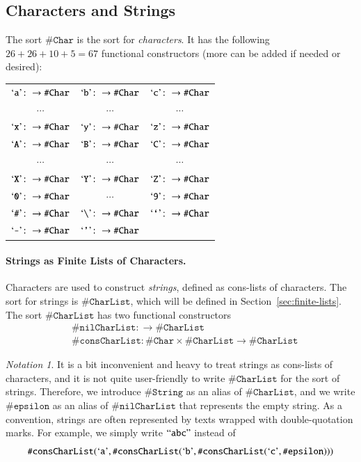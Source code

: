 \documentclass[UTF8,11pt]{article}
\newcounter{thmcounter}
\theoremstyle{plain}
\theoremstyle{definition}
\theoremstyle{remark}
\newtheorem{notation}   [thmcounter]{Notation}
\newcommand{\sharpsymbol}{\#}
\newcommand{\KChar}{\texttt{\sharpsymbol Char}}
\newcommand{\KCharList}{\texttt{\sharpsymbol CharList}}
\newcommand{\KString}{\texttt{\sharpsymbol String}}
\newcommand{\Kepsilon}{\texttt{\sharpsymbol epsilon}}
\newcommand{\KnilKCharList}{\texttt{\sharpsymbol nilCharList}}
\newcommand{\KconsKCharList}{\texttt{\sharpsymbol consCharList}}
\newcommand{\quottt}[1]{\textrm{\lq\texttt{#1}\rq}}
\newcommand{\qquottt}[1]{\textrm{``\texttt{#1}''}}
\newcommand{\slashsymbol}{\symbol{92}}
\begin{document}
\subsection{Characters and Strings}
\label{sec:chars-string}

The sort $\KChar$ is the sort for \emph{characters}. It has the following $26 +
26 + 10 + 5 = 67$ functional constructors (more can be added if needed or
desired):
\begin{center}
 \begin{tabular}{c c c}
  $\quottt{a} \colon \to \KChar$ & $\quottt{b} \colon \to \KChar$ &
  $\quottt{c} \colon \to \KChar$ \\
  $\cdots$ & $\cdots$ & $\cdots$ \\
  $\quottt{x} \colon \to \KChar$ & $\quottt{y} \colon \to \KChar$ &
  $\quottt{z} \colon \to \KChar$ \\
  $\quottt{A} \colon \to \KChar$ & $\quottt{B} \colon \to \KChar$ &
  $\quottt{C} \colon \to \KChar$ \\
  $\cdots$ & $\cdots$ & $\cdots$ \\
  $\quottt{X} \colon \to \KChar$ & $\quottt{Y} \colon \to \KChar$ &
  $\quottt{Z} \colon \to \KChar$ \\
  $\quottt{0} \colon \to \KChar$ & $\cdots$ & $\quottt{9} \colon \to
  \KChar$
  \\
  $\quottt{\sharpsymbol} \colon \to \KChar$ & $\quottt{\slashsymbol}
  \colon \to \KChar$ & $\quottt{`} \colon \to \KChar$
  \\
  $\quottt{-} \colon \to \KChar$ & $\quottt{'} \colon \to \KChar$
 \end{tabular}
\end{center}

\paragraph{Strings as Finite Lists of Characters.}
Characters are used to construct \emph{strings}, defined as cons-lists of
characters.
The sort for strings is $\KCharList$, which will be defined in
Section~\ref{sec:finite-lists}.
The sort $\KCharList$ has two functional constructors
\begin{align*}
& \KnilKCharList \colon \to \KCharList \\
& \KconsKCharList \colon \KChar \times \KCharList \to \KCharList
\end{align*}

\begin{notation}\label{not:strings}
It is a bit inconvenient and heavy to treat strings as cons-lists of
characters, and it is not quite user-friendly to write $\KCharList$ for the
sort of strings.
Therefore, we introduce $\KString$ as an alias of $\KCharList$, and we write
$\Kepsilon$ as an alias of $\KnilKCharList$ that represents the empty string.
As a convention, strings are often represented by texts wrapped with
double-quotation marks.
For example, we simply write $\qquottt{abc}$ instead of
 $$
 \KconsKCharList(\quottt{a}, \KconsKCharList(\quottt{b},
 \KconsKCharList(\quottt{c}, \Kepsilon)))
 $$
\end{notation}
\end{document}
